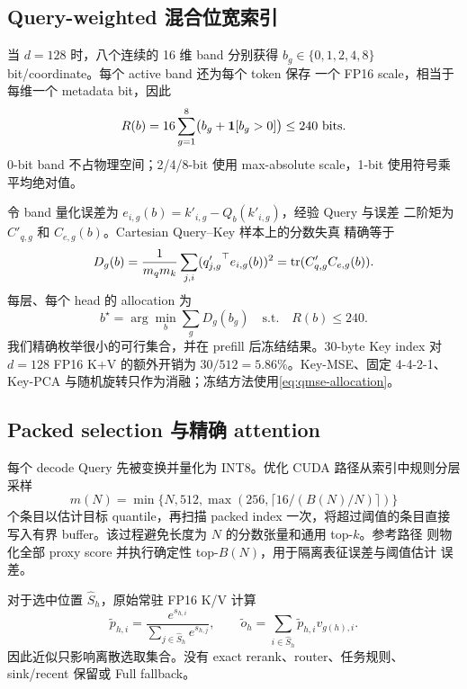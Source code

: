 \subsection{Query-weighted 混合位宽索引}

当 $d=128$ 时，八个连续的 16 维 band 分别获得
$b_g\in\{0,1,2,4,8\}$ bit/coordinate。每个 active band 还为每个 token 保存
一个 FP16 scale，相当于每维一个 metadata bit，因此
\begin{equation}
 R(b)=16\sum_{g=1}^{8}\bigl(b_g+\mathbf{1}[b_g>0]\bigr)\le240\text{ bits}.
 \label{eq:packed-rate}
\end{equation}
0-bit band 不占物理空间；2/4/8-bit 使用 max-absolute scale，1-bit 使用符号乘
平均绝对值。

令 band 量化误差为 $e_{i,g}(b)=k'_{i,g}-Q_b(k'_{i,g})$，经验 Query 与误差
二阶矩为 $C'_{q,g}$ 和 $C_{e,g}(b)$。Cartesian Query--Key 样本上的分数失真
精确等于
\begin{equation}
 D_g(b)=\frac{1}{m_qm_k}\sum_{j,i}
 ({q'_{j,g}}^\top e_{i,g}(b))^2
 =\operatorname{tr}(C'_{q,g}C_{e,g}(b)).
 \label{eq:band-qmse}
\end{equation}
每层、每个 head 的 allocation 为
\begin{equation}
 b^\star=\arg\min_b\sum_gD_g(b_g)\quad\text{s.t.}\quad R(b)\le240.
 \label{eq:qmse-allocation}
\end{equation}
我们精确枚举很小的可行集合，并在 prefill 后冻结结果。30-byte Key index 对
$d=128$ FP16 K+V 的额外开销为 $30/512=5.86\%$。Key-MSE、固定 4-4-2-1、
Key-PCA 与随机旋转只作为消融；冻结方法使用\cref{eq:qmse-allocation}。

\subsection{Packed selection 与精确 attention}

每个 decode Query 先被变换并量化为 INT8。优化 CUDA 路径从索引中规则分层
采样
\begin{equation}
 m(N)=\min\{N,512,\max(256,\lceil16/(B(N)/N)\rceil)\}
 \label{eq:frozen-quantile-samples}
\end{equation}
个条目以估计目标 quantile，再扫描 packed index 一次，将超过阈值的条目直接
写入有界 buffer。该过程避免长度为 $N$ 的分数张量和通用 top-$k$。参考路径
则物化全部 proxy score 并执行确定性 top-$B(N)$，用于隔离表征误差与阈值估计
误差。

对于选中位置 $\widehat S_h$，原始常驻 FP16 K/V 计算
\begin{equation}
 \widetilde p_{h,i}=\frac{e^{s_{h,i}}}
 {\sum_{j\in\widehat S_h}e^{s_{h,j}}},\qquad
 \widetilde o_h=\sum_{i\in\widehat S_h}\widetilde p_{h,i}v_{g(h),i}.
 \label{eq:sparse-attn}
\end{equation}
因此近似只影响离散选取集合。没有 exact rerank、router、任务规则、
sink/recent 保留或 Full fallback。

